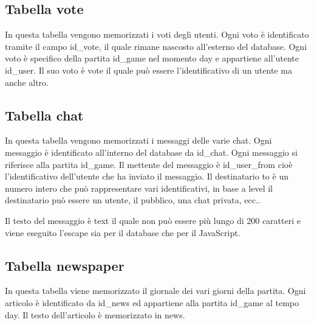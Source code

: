 \documentclass[10pt,a4paper]{article}
\begin{document}
\subsection{Tabella vote}
In questa tabella vengono memorizzati i voti degli utenti. Ogni voto è identificato tramite il campo \textsf{id\_vote}, il quale rimane nascosto all'esterno del database. Ogni voto è specifico della partita \textsf{id\_game} nel momento \textsf{day} e appartiene all'utente \textsf{id\_user}. Il suo voto è \textsf{vote} il quale può essere l'identificativo di un utente ma anche altro. 

\subsection{Tabella chat}
In questa tabella vengono memorizzati i messaggi delle varie chat. Ogni messaggio è identificato all'interno del database da \textsf{id\_chat}. Ogni messaggio si riferisce alla partita \textsf{id\_game}. Il mettente del messaggio è \textsf{id\_user\_from} cioè l'identificativo dell'utente che ha inviato il messaggio. Il destinatario \textsf{to} è un numero intero che può rappresentare vari identificativi, in base a \textsf{level} il destinatario può essere un utente, il pubblico, una chat privata, ecc..

Il testo del messaggio è \textsf{text} il quale non può essere più lungo di 200 caratteri e viene eseguito l'escape sia per il database che per il JavaScript.

\subsection{Tabella newspaper}
In questa tabella viene memorizzato il giornale dei vari giorni della partita. Ogni articolo è identificato da \textsf{id\_news} ed appartiene alla partita \textsf{id\_game} al tempo \textsf{day}. Il testo dell'articolo è memorizzato in \textsf{news}.

\newpage
\tableofcontents
\end{document}
